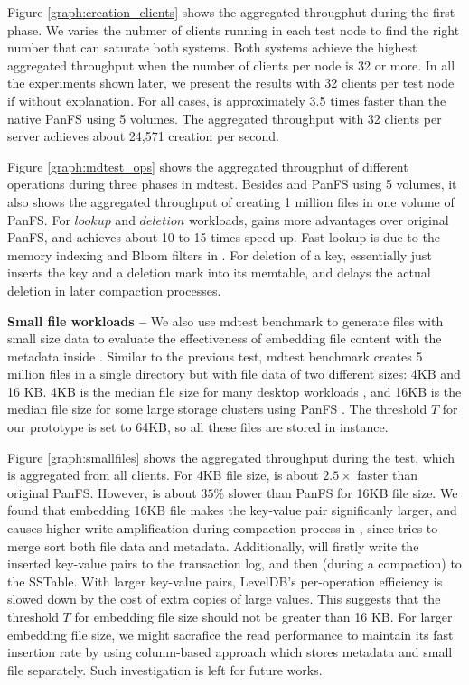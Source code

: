 Figure \ref{graph:creation_clients} shows the aggregated througphut during
the first phase. We varies the nubmer of clients running in each test node
to find the right number that can saturate both systems.
Both systems achieve the highest aggregated throughput when the number
of clients per node is 32 or more. In all the experiments shown later,
we present the results with 32 clients per test node if without explanation.
For all cases, \psys is approximately 3.5 times faster than the native PanFS
using 5 volumes. The aggregated throughput with 32 clients per server
achieves about 24,571 creation per second.

Figure \ref{graph:mdtest_ops} shows the aggregated througphut of
different operations during three phases in mdtest.
Besides \psys and PanFS using 5 volumes, it also shows
the aggregated throughput of creating 1 million files in one volume of PanFS.
For $lookup$ and $deletion$ workloads,
\psys gains more advantages over original PanFS,
and achieves about 10 to 15 times speed up.
Fast lookup is due to the memory indexing and Bloom filters in \ldb.
For deletion of a key, \ldb essentially just inserts the key and a deletion mark
into its memtable, and delays the actual deletion in later compaction processes.


\textbf{Small file workloads -- }
We also use mdtest benchmark to generate files with small size data to evaluate
the effectiveness of embedding file content with the metadata inside \tfs.
Similar to the previous test,
mdtest benchmark creates 5 million files in a single directory
but with file data of two different sizes: 4KB and 16 KB.
4KB is the median file size for many desktop workloads \cite{Bill11},
and 16KB is the median file size for some large storage clusters using PanFS \cite{brent13}.
The threshold $T$ for our prototype is set to 64KB, so all these files
are stored in \tfs instance.

Figure \ref{graph:smallfiles} shows the aggregated throughput during the test,
which is aggregated from all clients. For 4KB file size,
\psys is about $2.5\times$ faster than original PanFS.
However, \psys is about $35\%$ slower than PanFS for 16KB file size.
We found that embedding 16KB file makes the key-value pair significanly larger,
and causes higher write amplification during compaction process in \ldb,
since \ldb tries to merge sort both file data and metadata.
Additionally, \ldb will firstly write the inserted key-value pairs
to the transaction log, and then (during a compaction) to the SSTable.
With larger key-value pairs, LevelDB's per-operation efficiency is
slowed down by the cost of extra copies of large values.
This suggests that the threshold $T$ for embedding file size should not be
greater than 16 KB. For larger embedding file size,
we might sacrafice the read performance to maintain its fast insertion rate
by using column-based approach which stores metadata and small file separately.
Such investigation is left for future works.

